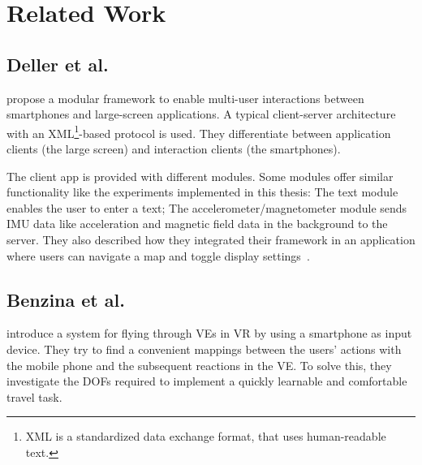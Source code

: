 \chapter{Related Work}\label{chapter:related-work}


\section{Deller et al.}\label{section:deller-2011}
\citeauthor{Deller.2011} propose a modular framework to enable multi-user interactions between smartphones and large-screen applications. A typical client-server architecture with an XML\footnote{XML is a standardized data exchange format, that uses human-readable text.}-based protocol is used. They differentiate between application clients (the large screen) and interaction clients (the smartphones).

The client app is provided with different modules. Some modules offer similar functionality like the experiments implemented in this thesis: The text module enables the user to enter a text; The accelerometer/magnetometer module sends \gls{IMU} data like acceleration and magnetic field data in the background to the server. They also described how they integrated their framework in an application where users can navigate a map and toggle display settings~\cite{Deller.2011}.


\section{Benzina et al.}\label{section:benzina-2011}
\citeauthor{Benzina.2011} introduce a system for flying through \glspl{VE} in \gls{VR} by using a smartphone as input device.
They try to find a convenient mappings between the users' actions with the mobile phone and the subsequent reactions in the \gls{VE}. To solve this, they investigate the \glspl{DOF} required to implement a quickly learnable and comfortable travel task.

